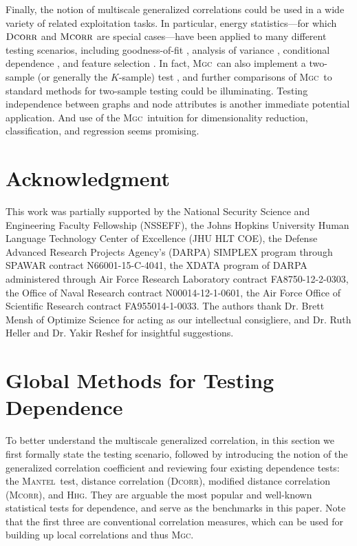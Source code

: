 \documentclass[11pt]{article}
\providecommand{\sct}[1]{{\normalfont\textsc{#1}}}
\newcommand{\Mgc}{\sct{Mgc}}
\newcommand{\Hhg}{\sct{Hhg}}
\newcommand{\Dcorr}{\sct{Dcorr}}
\newcommand{\Mcorr}{\sct{Mcorr}}
\newcommand{\Mantel}{\sct{Mantel}}
\begin{document}
Finally, the notion of multiscale generalized correlations could be used in a wide variety of related exploitation tasks.  In particular, energy statistics---for which $\Dcorr$ and $\Mcorr$ are special cases---have been applied to many different testing scenarios, including goodness-of-fit  \cite{Szekely2005}, analysis of variance  \cite{Rizzo2010}, conditional dependence  \cite{Szekely2014,Wang2015},   and feature selection \cite{LiZhongZhu2012,Zhong2015}.     
In fact, \Mgc~can also implement a two-sample (or generally the $K$-sample) test \cite{Szekely2004, heller2016consistent}, and further comparisons of \Mgc~to standard methods for two-sample testing could be illuminating.
Testing independence between graphs and node attributes \cite{Fosdick2015} is another immediate potential application.  And use of the \Mgc~intuition for dimensionality reduction, classification, and regression seems promising.



\clearpage
\pagestyle{plain}




\section*{Acknowledgment}
This work was partially supported by the
%
National Security Science and Engineering Faculty Fellowship (NSSEFF),
%
the Johns Hopkins University Human Language Technology Center of Excellence (JHU HLT COE),  the
%
Defense Advanced Research Projects Agency's (DARPA) SIMPLEX program through SPAWAR contract N66001-15-C-4041,
%
the XDATA program of DARPA administered through Air Force Research Laboratory contract FA8750-12-2-0303,
%
the Office of Naval Research contract N00014-12-1-0601,
%
the Air Force Office of Scientific Research contract FA955014-1-0033. The authors thank Dr. Brett Mensh of Optimize Science for acting as our intellectual consigliere, and Dr. Ruth Heller and Dr. Yakir Reshef for insightful suggestions.

\clearpage
\appendix
\setcounter{figure}{0}
\renewcommand{\thealgorithm}{C\arabic{algorithm}}
\renewcommand{\thefigure}{E\arabic{figure}}
\renewcommand{\thesubsection}{\thesection.\Roman{subsection}}

\section{Global Methods for Testing Dependence}
\label{appen:global}
To better understand the multiscale generalized correlation, in this section we first formally state the testing scenario, followed by introducing the notion of the generalized correlation coefficient and reviewing four existing dependence tests: the \Mantel~test, distance correlation (\Dcorr), modified distance correlation (\Mcorr), and \Hhg. They are arguable the most popular and well-known statistical tests for dependence, and serve as the benchmarks in this paper. Note that the first three are conventional correlation measures, which can be used for building up local correlations and thus  \Mgc.
\end{document}
